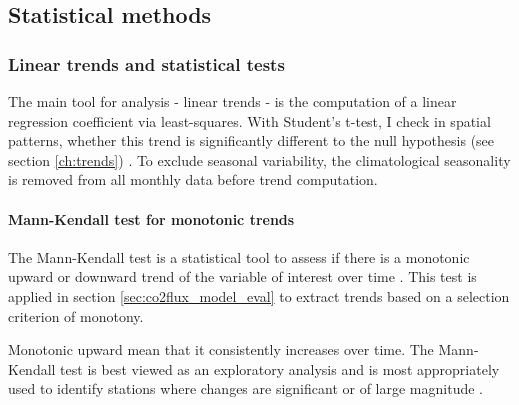 \documentclass[12pt]{article}
\begin{document}



\clearpage

\subsection{Statistical methods}

\subsubsection{Linear trends and statistical tests}
The main tool for analysis - linear trends - is the computation of a linear regression coefficient via least-squares. With Student's t-test, I check in spatial patterns, whether this trend is significantly different to the null hypothesis (see section \ref{ch:trends}) \citep{Mood1974}. To exclude seasonal variability, the climatological seasonality is removed from all monthly data before trend computation. 


\paragraph{Mann-Kendall test for monotonic trends}
The Mann-Kendall test is a statistical tool to assess if there is a monotonic upward or downward trend of the variable of interest over time \citep{Mann1945,Kendall1975}. This test is applied in section \ref{sec:co2flux_model_eval} to extract trends based on a selection criterion of monotony.

Monotonic upward mean that it consistently increases over time. The Mann-Kendall test is best viewed as an exploratory analysis and is most appropriately used to identify stations where changes are significant or of large magnitude \citep{Hirsch1982}.
\end{document}
